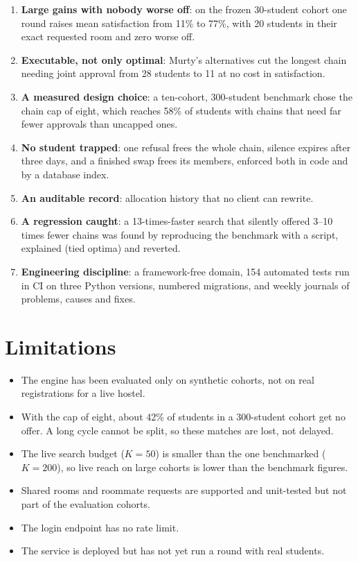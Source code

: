 \begin{enumerate}
  \item \textbf{Large gains with nobody worse off}: on the frozen
  30-student cohort one round raises mean satisfaction from 11\% to
  77\%, with 20 students in their exact requested room and zero worse
  off.
  \item \textbf{Executable, not only optimal}: Murty's alternatives cut
  the longest chain needing joint approval from 28 students to 11 at no
  cost in satisfaction.
  \item \textbf{A measured design choice}: a ten-cohort, 300-student
  benchmark chose the chain cap of eight, which reaches 58\% of students
  with chains that need far fewer approvals than uncapped ones.
  \item \textbf{No student trapped}: one refusal frees the whole chain,
  silence expires after three days, and a finished swap frees its
  members, enforced both in code and by a database index.
  \item \textbf{An auditable record}: allocation history that no client
  can rewrite.
  \item \textbf{A regression caught}: a 13-times-faster search that
  silently offered 3--10 times fewer chains was found by reproducing the
  benchmark with a script, explained (tied optima) and reverted.
  \item \textbf{Engineering discipline}: a framework-free domain, 154
  automated tests run in CI on three Python versions, numbered
  migrations, and weekly journals of problems, causes and fixes.
\end{enumerate}

\section{Limitations}

\begin{itemize}
  \item The engine has been evaluated only on synthetic cohorts, not on
  real registrations for a live hostel.
  \item With the cap of eight, about 42\% of students in a 300-student
  cohort get no offer. A long cycle cannot be split, so these matches
  are lost, not delayed.
  \item The live search budget ($K = 50$) is smaller than the one
  benchmarked ($K = 200$), so live reach on large cohorts is lower than
  the benchmark figures.
  \item Shared rooms and roommate requests are supported and unit-tested
  but not part of the evaluation cohorts.
  \item The login endpoint has no rate limit.
  \item The service is deployed but has not yet run a round with real
  students.
\end{itemize}

